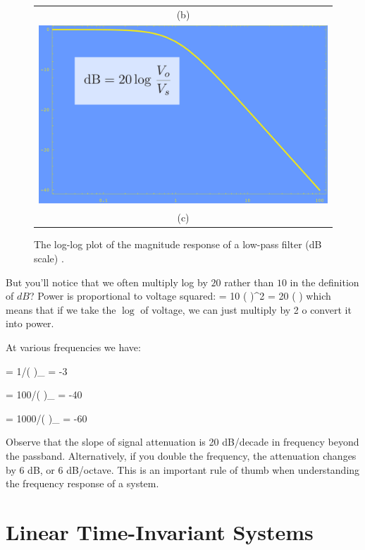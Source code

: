 \begin{figure}[tbp]
\begin{center}
\begin{tabular}{c}
(b) \\
\includegraphics[width=.6\columnwidth]{dB} \\
(c) \\
\end{tabular}
\end{center}
\caption{The log-log plot of the magnitude response of a low-pass filter (dB scale) . } \label{fig:magphasedB}
\end{figure}


But you'll notice that we often multiply log by $20$ rather than $10$ in the definition of $dB$?   Power is proportional to voltage squared:
\be
  = 10 \log\left(  \right)^2 = 20 \log\left(  \right)
\ee
which means that if we take the $\log$ of voltage, we can just multiply by 2 o convert it into power.

At various frequencies we have:

\be \omega = 1/\tau \rightarrow \left(  \right)_{} = -3  \ee

\be \omega = 100/\tau \rightarrow \left(  \right)_{} = -40  \ee

\be \omega = 1000/\tau \rightarrow \left(  \right)_{} = -60  \ee

Observe that the slope of signal attenuation is 20 dB/decade in frequency beyond the passband.   Alternatively, if you double the frequency, the attenuation changes by 6 dB, or 6 dB/octave.  This is an important rule of thumb when understanding the frequency response of a system.


\section{Linear Time-Invariant Systems}

